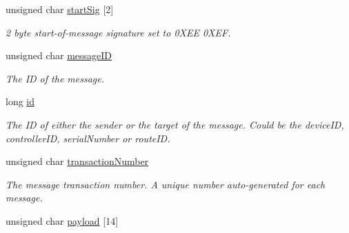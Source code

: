 \begin{DoxyCompactItemize}
\item 
\mbox{\label{struct_u_d_p_message_struct_a40c0afec4be20d7cfaac97b3ec90cb56}} 
unsigned char \hyperlink{struct_u_d_p_message_struct_a40c0afec4be20d7cfaac97b3ec90cb56}{start\+Sig} \mbox{[}2\mbox{]}
\begin{DoxyCompactList}\small\item\em 2 byte start-\/of-\/message signature set to 0\+X\+EE 0\+X\+EF. \end{DoxyCompactList}\item 
\mbox{\label{struct_u_d_p_message_struct_a5b9f258b174a6d6a738baa8033243573}} 
unsigned char \hyperlink{struct_u_d_p_message_struct_a5b9f258b174a6d6a738baa8033243573}{message\+ID}
\begin{DoxyCompactList}\small\item\em The ID of the message. \end{DoxyCompactList}\item 
\mbox{\label{struct_u_d_p_message_struct_a363553f26a5a6b317dc5b0b4c227f966}} 
long \hyperlink{struct_u_d_p_message_struct_a363553f26a5a6b317dc5b0b4c227f966}{id}
\begin{DoxyCompactList}\small\item\em The ID of either the sender or the target of the message. Could be the device\+ID, controller\+ID, serial\+Number or route\+ID. \end{DoxyCompactList}\item 
\mbox{\label{struct_u_d_p_message_struct_a98ed3cc3a244ee9637f6b85fcf6165b8}} 
unsigned char \hyperlink{struct_u_d_p_message_struct_a98ed3cc3a244ee9637f6b85fcf6165b8}{transaction\+Number}
\begin{DoxyCompactList}\small\item\em The message transaction number. A unique number auto-\/generated for each message. \end{DoxyCompactList}\item 
\mbox{\label{struct_u_d_p_message_struct_a52de02b6a926e10a0ef99c1ae965719e}} 
unsigned char \hyperlink{struct_u_d_p_message_struct_a52de02b6a926e10a0ef99c1ae965719e}{payload} \mbox{[}14\mbox{]}

\end{DoxyCompactItemize}
